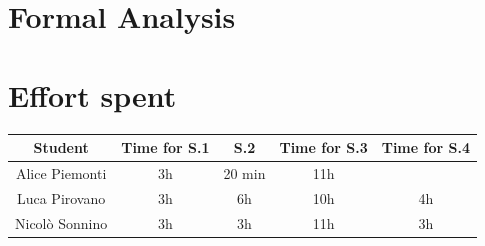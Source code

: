 \documentclass[table, 12pt]{article}
\begin{document}
\begin{flushleft}
    \section{Formal Analysis}
    \newpage
    \section{Effort spent}
    \begin{tabular}{ | c || c | c | c | c|}
        \hline
        Student        & Time for S.1 & S.2    & Time for S.3 & Time for S.4 \\ \hline
        Alice Piemonti & 3h           & 20 min & 11h          &              \\ \hline
        Luca Pirovano  & 3h           & 6h     & 10h          & 4h           \\ \hline
        Nicolò Sonnino & 3h           & 3h     & 11h          & 3h            \\ 
        \hline
    \end{tabular}
\end{flushleft}
\end{document}
